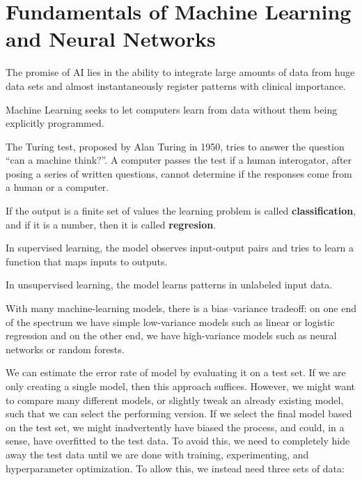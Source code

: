 \chapter{Fundamentals of Machine Learning and Neural Networks}

The promise of AI lies in the ability 
to integrate large amounts of data from huge data sets
and almost instantaneously register patterns
with clinical importance.

Machine Learning seeks to let computers learn from data
without them being explicitly programmed.


The Turing test, proposed by Alan Turing in 1950,
tries to answer the question \enquote{can a machine think?}.
A computer passes the test if a human interogator,
after posing a series of written questions,
cannot determine if the responses come from a human or a computer.



If the output is a finite set of values
the learning problem is called \textbf{classification},
and if it is a number, then it is called \textbf{regresion}.

In supervised learning, the model observes input-output pairs
and tries to learn a function that maps inputs to outputs.

In unsupervised learning, the model learns patterns in unlabeled input data.

With many machine-learning models, there is a bias--variance tradeoff:
on one end of the spectrum we have simple low-variance models 
such as linear or logistic regression
and on the other end, we have high-variance models
such as neural networks or random forests.

We can estimate the error rate of model
by evaluating it on a test set.
If we are only creating a single model,
then this approach suffices. 
However, we might want to compare many different models,
or slightly tweak an already existing model,
such that we can select the performing version.
If we select the final model based on the test set,
we might inadvertently have biased the process,
and could, in a sense, have overfitted to the test data.
To avoid this, we need to completely hide away the test data
until we are done with training, experimenting, 
and hyperparameter optimization.
To allow this, we instead need three sets of data:

